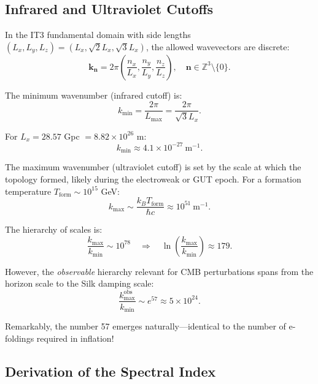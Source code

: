 \documentclass[12pt,a4paper]{article}
\begin{document}
\subsection{Infrared and Ultraviolet Cutoffs}

In the IT3 fundamental domain with side lengths $(L_x, L_y, L_z) = (L_x, \sqrt{2}L_x, \sqrt{3}L_x)$, the allowed wavevectors are discrete:
\begin{equation}
\mathbf{k}_{\mathbf{n}} = 2\pi \left(\frac{n_x}{L_x}, \frac{n_y}{L_y}, \frac{n_z}{L_z}\right), \quad \mathbf{n} \in \mathbb{Z}^3 \setminus \{0\}.
\end{equation}

The minimum wavenumber (infrared cutoff) is:
\begin{equation}
k_{\min} = \frac{2\pi}{L_{\max}} = \frac{2\pi}{\sqrt{3} L_x}.
\end{equation}

For $L_x = 28.57$ Gpc $= 8.82 \times 10^{26}$ m:
\begin{equation}
k_{\min} \approx 4.1 \times 10^{-27}~\mathrm{m}^{-1}.
\end{equation}

The maximum wavenumber (ultraviolet cutoff) is set by the scale at which the topology formed, likely during the electroweak or GUT epoch. For a formation temperature $T_{\mathrm{form}} \sim 10^{15}$ GeV:
\begin{equation}
k_{\max} \sim \frac{k_B T_{\mathrm{form}}}{\hbar c} \approx 10^{51}~\mathrm{m}^{-1}.
\end{equation}

The hierarchy of scales is:
\begin{equation}
\frac{k_{\max}}{k_{\min}} \sim 10^{78} \quad \Rightarrow \quad \ln\left(\frac{k_{\max}}{k_{\min}}\right) \approx 179.
\end{equation}

However, the \textit{observable} hierarchy relevant for CMB perturbations spans from the horizon scale to the Silk damping scale:
\begin{equation}
\frac{k_{\max}^{\mathrm{obs}}}{k_{\min}} \sim e^{57} \approx 5 \times 10^{24}.
\end{equation}

Remarkably, the number 57 emerges naturally---identical to the number of e-foldings required in inflation!

\subsection{Derivation of the Spectral Index}
\end{document}
